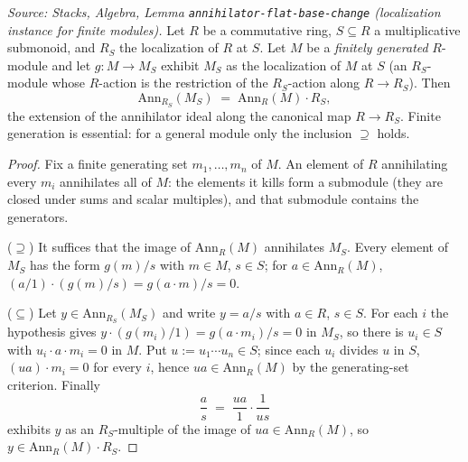 
\begin{lemma}
  \label{lem:annihilator_localization_eq_map}
  \leanok
  \textit{Source: Stacks, Algebra, Lemma \texttt{annihilator-flat-base-change}
  (localization instance for finite modules).}
  Let \(R\) be a commutative ring, \(S \subseteq R\) a multiplicative submonoid, and
  \(R_S\) the localization of \(R\) at \(S\). Let \(M\) be a \emph{finitely
  generated} \(R\)-module and let \(g : M \to M_S\) exhibit \(M_S\) as the
  localization of \(M\) at \(S\) (an \(R_S\)-module whose \(R\)-action is the
  restriction of the \(R_S\)-action along \(R \to R_S\)). Then
  \[
    \mathrm{Ann}_{R_S}(M_S) \;=\; \mathrm{Ann}_R(M) \cdot R_S,
  \]
  the extension of the annihilator ideal along the canonical map
  \(R \to R_S\). Finite generation is essential: for a general module only the
  inclusion \(\supseteq\) holds.
\end{lemma}
\begin{proof}
  \leanok
  Fix a finite generating set \(m_1, \dots, m_n\) of \(M\). An element of \(R\)
  annihilating every \(m_i\) annihilates all of \(M\): the elements it kills form
  a submodule (they are closed under sums and scalar multiples), and that
  submodule contains the generators.

  (\(\supseteq\)) It suffices that the image of \(\mathrm{Ann}_R(M)\)
  annihilates \(M_S\). Every element of \(M_S\) has the form \(g(m)/s\) with
  \(m \in M\), \(s \in S\); for \(a \in \mathrm{Ann}_R(M)\),
  \((a/1)\cdot(g(m)/s) = g(a \cdot m)/s = 0\).

  (\(\subseteq\)) Let \(y \in \mathrm{Ann}_{R_S}(M_S)\) and write \(y = a/s\)
  with \(a \in R\), \(s \in S\). For each \(i\) the hypothesis gives
  \(y \cdot (g(m_i)/1) = g(a \cdot m_i)/s = 0\) in \(M_S\), so there is
  \(u_i \in S\) with \(u_i \cdot a \cdot m_i = 0\) in \(M\). Put
  \(u := u_1 \cdots u_n \in S\); since each \(u_i\) divides \(u\) in \(S\),
  \((u a) \cdot m_i = 0\) for every \(i\), hence
  \(u a \in \mathrm{Ann}_R(M)\) by the generating-set criterion. Finally
  \[
    \frac{a}{s} \;=\; \frac{ua}{1} \cdot \frac{1}{us}
  \]
  exhibits \(y\) as an \(R_S\)-multiple of the image of
  \(ua \in \mathrm{Ann}_R(M)\), so \(y \in \mathrm{Ann}_R(M) \cdot R_S\).
\end{proof}

